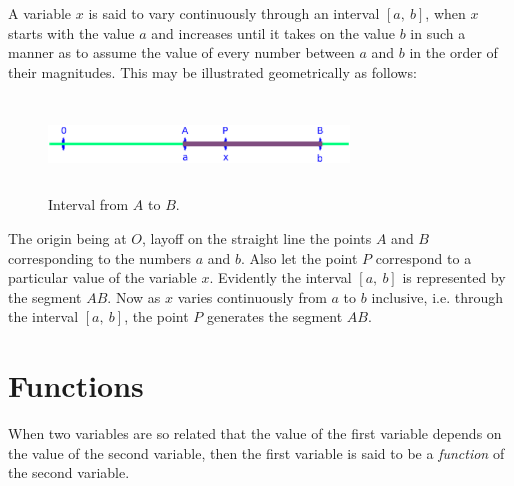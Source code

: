 A variable $x$ is said to vary continuously 
through an interval $\left \lbrack a,\ b \right \rbrack$, when 
$x$ starts with the value $a$ and increases until it takes on 
the value $b$ in such a manner as to assume the value of every 
number between $a$ and $b$ in the order of their magnitudes. 
This may be illustrated geometrically as follows:


\begin{figure}[h]
\begin{minipage}{\textwidth}
\begin{center}
\includegraphics[height=2.5cm,width=8cm]{line-segment.eps}
\end{center}
\end{minipage}
\caption{Interval from $A$ to $B$.}
\label{fig:AB}
\end{figure}

\noindent
The origin being at $O$, layoff on the straight line the points 
$A$ and $B$ corresponding to the numbers $a$ and $b$. Also 
let the point $P$ correspond to a particular value of the variable $x$. 
Evidently the interval $\left \lbrack a,\ b \right \rbrack$ is 
represented by the segment $AB$. Now as $x$ varies continuously 
from $a$ to $b$ inclusive, i.e. through the interval 
$\left \lbrack a,\ b \right \rbrack$, the point $P$ 
generates the segment $AB$.


\section{Functions} 

When two variables are so related that the 
value of the first variable depends on the value of the second 
variable, then the first variable is said to be a {\it function} of 
the second variable.

